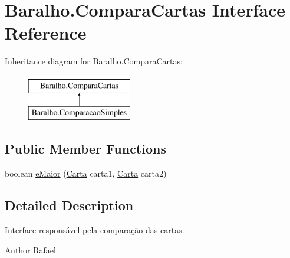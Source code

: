 \hypertarget{interface_baralho_1_1_compara_cartas}{
\section{\-Baralho.\-Compara\-Cartas \-Interface \-Reference}
\label{interface_baralho_1_1_compara_cartas}
}
\-Inheritance diagram for \-Baralho.\-Compara\-Cartas\-:\begin{figure}[H]
\begin{center}
\leavevmode
\includegraphics[height=2.000000cm]{interface_baralho_1_1_compara_cartas}
\end{center}
\end{figure}
\subsection*{\-Public \-Member \-Functions}
\begin{DoxyCompactItemize}
\item 
boolean \hyperlink{interface_baralho_1_1_compara_cartas_a805a502954c21d6fac410506bf81c955}{e\-Maior} (\hyperlink{class_baralho_1_1_carta}{\-Carta} carta1, \hyperlink{class_baralho_1_1_carta}{\-Carta} carta2)
\end{DoxyCompactItemize}


\subsection{\-Detailed \-Description}
\-Interface responsável pela comparação das cartas. \begin{DoxyAuthor}{\-Author}
\-Rafael 
\end{DoxyAuthor}


